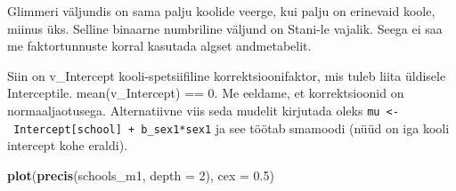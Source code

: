 \documentclass[]{book}
\newenvironment{Shaded}{\begin{snugshade}}{\end{snugshade}}
\newcommand{\KeywordTok}[1]{\textcolor[rgb]{0.13,0.29,0.53}{\textbf{#1}}}
\newcommand{\DataTypeTok}[1]{\textcolor[rgb]{0.13,0.29,0.53}{#1}}
\newcommand{\DecValTok}[1]{\textcolor[rgb]{0.00,0.00,0.81}{#1}}
\newcommand{\FloatTok}[1]{\textcolor[rgb]{0.00,0.00,0.81}{#1}}
\newcommand{\StringTok}[1]{\textcolor[rgb]{0.31,0.60,0.02}{#1}}
\newcommand{\CommentTok}[1]{\textcolor[rgb]{0.56,0.35,0.01}{\textit{#1}}}
\newcommand{\OperatorTok}[1]{\textcolor[rgb]{0.81,0.36,0.00}{\textbf{#1}}}
\newcommand{\NormalTok}[1]{#1}
\begin{document}
Glimmeri väljundis on sama palju koolide veerge, kui palju on erinevaid
koole, miinus üks. Selline binaarne numbriline väljund on Stani-le
vajalik. Seega ei saa me faktortunnuste korral kasutada algset
andmetabelit.

\begin{Shaded}
\end{Shaded}

\begin{Shaded}
\end{Shaded}

Siin on v\_Intercept kooli-spetsiifiline korrektsioonifaktor, mis tuleb
liita üldisele Interceptile. mean(v\_Intercept) == 0. Me eeldame, et
korrektsioonid on normaaljaotusega. Alternatiivne viis seda mudelit
kirjutada oleks
\texttt{mu\ \textless{}-\ Intercept{[}school{]}\ +\ b\_sex1*sex1} ja see
töötab smamoodi (nüüd on iga kooli intercept kohe eraldi).

\begin{Shaded}
\begin{Highlighting}[]
\KeywordTok{plot}\NormalTok{(}\KeywordTok{precis}\NormalTok{(schools_m1, }\DataTypeTok{depth =} \DecValTok{2}\NormalTok{), }\DataTypeTok{cex =} \FloatTok{0.5}\NormalTok{)}
\end{Highlighting}
\end{Shaded}
\end{document}
